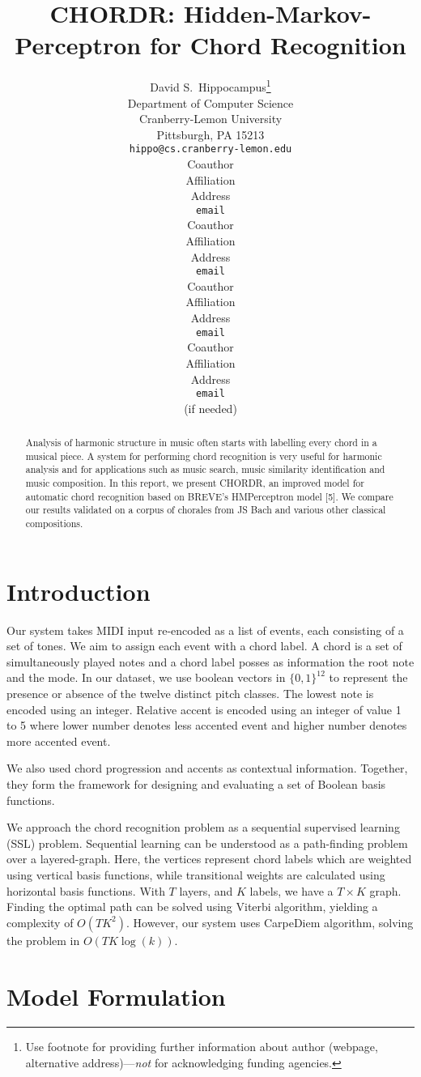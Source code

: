 \documentclass{article} %
\title{CHORDR: Hidden-Markov-Perceptron for Chord Recognition}
\author{
David S.~Hippocampus\thanks{ Use footnote for providing further information
about author (webpage, alternative address)---\emph{not} for acknowledging
funding agencies.} \\
Department of Computer Science\\
Cranberry-Lemon University\\
Pittsburgh, PA 15213 \\
\texttt{hippo@cs.cranberry-lemon.edu} \\
\And
Coauthor \\
Affiliation \\
Address \\
\texttt{email} \\
\AND
Coauthor \\
Affiliation \\
Address \\
\texttt{email} \\
\And
Coauthor \\
Affiliation \\
Address \\
\texttt{email} \\
\And
Coauthor \\
Affiliation \\
Address \\
\texttt{email} \\
(if needed)\\
}
\begin{document}
\maketitle

\begin{abstract}
Analysis of harmonic structure in music often starts with labelling every chord in a musical piece. A system for performing chord recognition is very useful for harmonic analysis and for applications such as music search, music similarity identification and music composition. In this report, we present CHORDR, an improved model for automatic chord recognition based on BREVE’s HMPerceptron model [5]. We compare our results validated on a corpus of chorales from JS Bach and various other classical compositions.
\end{abstract}

\section{Introduction}

Our system takes MIDI input re-encoded as a list of events, each consisting of a set of tones. We aim to assign each event with a chord label. A chord is a set of simultaneously played notes and a chord label posses as information the root note and the mode. In our dataset, we use boolean vectors in $\{0,1\}^{12}$ to represent the presence or absence of the twelve distinct pitch classes. The lowest note is encoded using an integer. Relative accent is encoded using an integer of value 1 to 5 where lower number denotes less accented event and higher number denotes more accented event.

We also used chord progression and accents as contextual information. Together, they form the framework for designing and evaluating a set of Boolean basis functions.

We approach the chord recognition problem as a sequential supervised learning (SSL) problem. Sequential learning can be understood as a path-finding problem over a layered-graph. Here, the vertices represent chord labels which are weighted using vertical basis functions, while transitional weights are calculated using horizontal basis functions. With $T$ layers, and $K$ labels, we have a $T \times K$ graph. Finding the optimal path can be solved using Viterbi algorithm, yielding a complexity of $O(TK^2)$. However, our system uses CarpeDiem algorithm, solving the problem in $O(TK\log(k))$.

\section{Model Formulation}
\end{document}

